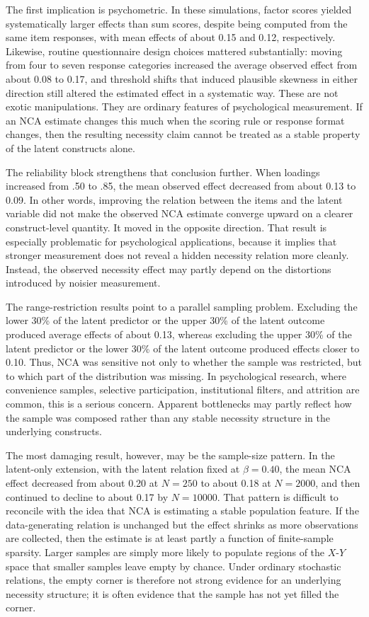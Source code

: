 \documentclass[
  man,
  longtable,
  nolmodern,
  notxfonts,
  notimes,
  colorlinks=true,linkcolor=blue,citecolor=blue,urlcolor=blue]{apa7}
\begin{document}
The first implication is psychometric. In these simulations, factor
scores yielded systematically larger effects than sum scores, despite
being computed from the same item responses, with mean effects of about
0.15 and 0.12, respectively. Likewise, routine questionnaire design
choices mattered substantially: moving from four to seven response
categories increased the average observed effect from about 0.08 to
0.17, and threshold shifts that induced plausible skewness in either
direction still altered the estimated effect in a systematic way. These
are not exotic manipulations. They are ordinary features of
psychological measurement. If an NCA estimate changes this much when the
scoring rule or response format changes, then the resulting necessity
claim cannot be treated as a stable property of the latent constructs
alone.

The reliability block strengthens that conclusion further. When loadings
increased from .50 to .85, the mean observed effect decreased from about
0.13 to 0.09. In other words, improving the relation between the items
and the latent variable did not make the observed NCA estimate converge
upward on a clearer construct-level quantity. It moved in the opposite
direction. That result is especially problematic for psychological
applications, because it implies that stronger measurement does not
reveal a hidden necessity relation more cleanly. Instead, the observed
necessity effect may partly depend on the distortions introduced by
noisier measurement.

The range-restriction results point to a parallel sampling problem.
Excluding the lower 30\% of the latent predictor or the upper 30\% of
the latent outcome produced average effects of about 0.13, whereas
excluding the upper 30\% of the latent predictor or the lower 30\% of
the latent outcome produced effects closer to 0.10. Thus, NCA was
sensitive not only to whether the sample was restricted, but to which
part of the distribution was missing. In psychological research, where
convenience samples, selective participation, institutional filters, and
attrition are common, this is a serious concern. Apparent bottlenecks
may partly reflect how the sample was composed rather than any stable
necessity structure in the underlying constructs.

The most damaging result, however, may be the sample-size pattern. In
the latent-only extension, with the latent relation fixed at
\(\beta = 0.40\), the mean NCA effect decreased from about 0.20 at
\(N = 250\) to about 0.18 at \(N = 2000\), and then continued to decline
to about 0.17 by \(N = 10000\). That pattern is difficult to reconcile
with the idea that NCA is estimating a stable population feature. If the
data-generating relation is unchanged but the effect shrinks as more
observations are collected, then the estimate is at least partly a
function of finite-sample sparsity. Larger samples are simply more
likely to populate regions of the \(X\)-\(Y\) space that smaller samples
leave empty by chance. Under ordinary stochastic relations, the empty
corner is therefore not strong evidence for an underlying necessity
structure; it is often evidence that the sample has not yet filled the
corner.
\end{document}
